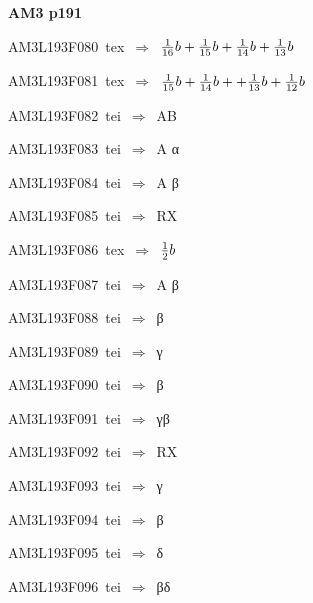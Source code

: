 \par\vfill\eject
{\bf\hfill AM3 p191\hfill\hbox{}}\par\bigskip
{\sixrm AM3L193F080\ {\sixit tex}\ }$\Rightarrow$\ ${{1\over 16}}b + {{1\over 15}}b + {{1\over 14}}b + {{1\over 13}}b$\par\smallskip
{\sixrm AM3L193F081\ {\sixit tex}\ }$\Rightarrow$\ ${{1\over 15}}b + {{1\over 14}}b + + {{1\over 13}}b + {{1\over 12}}b$\par\smallskip
{\sixrm AM3L193F082\ {\sixit tei}\ }$\Rightarrow$\ AB\par\smallskip
{\sixrm AM3L193F083\ {\sixit tei}\ }$\Rightarrow$\ A α\par\smallskip
{\sixrm AM3L193F084\ {\sixit tei}\ }$\Rightarrow$\ A β\par\smallskip
{\sixrm AM3L193F085\ {\sixit tei}\ }$\Rightarrow$\ RX\par\smallskip
{\sixrm AM3L193F086\ {\sixit tex}\ }$\Rightarrow$\ ${{1\over 2}}b$\par\smallskip
{\sixrm AM3L193F087\ {\sixit tei}\ }$\Rightarrow$\ A β\par\smallskip
{\sixrm AM3L193F088\ {\sixit tei}\ }$\Rightarrow$\ β\par\smallskip
{\sixrm AM3L193F089\ {\sixit tei}\ }$\Rightarrow$\ γ\par\smallskip
{\sixrm AM3L193F090\ {\sixit tei}\ }$\Rightarrow$\ β\par\smallskip
{\sixrm AM3L193F091\ {\sixit tei}\ }$\Rightarrow$\ γβ\par\smallskip
{\sixrm AM3L193F092\ {\sixit tei}\ }$\Rightarrow$\ RX\par\smallskip
{\sixrm AM3L193F093\ {\sixit tei}\ }$\Rightarrow$\ γ\par\smallskip
{\sixrm AM3L193F094\ {\sixit tei}\ }$\Rightarrow$\ β\par\smallskip
{\sixrm AM3L193F095\ {\sixit tei}\ }$\Rightarrow$\ δ\par\smallskip
{\sixrm AM3L193F096\ {\sixit tei}\ }$\Rightarrow$\ βδ\par\smallskip

